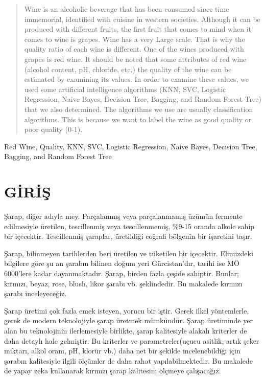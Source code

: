 \documentclass[conference]{IEEEtran}
\begin{document}
\begin{abstract}
Wine is an alcoholic beverage that has been consumed since time immemorial, identified with cuisine in western societies. Although it can be produced with different fruits, the first fruit that comes to mind when it comes to wine is grapes. Wine has a very Large scale. That is why the quality ratio of each wine is different. One of the wines produced with grapes is red wine. It should be noted that some attributes of red wine (alcohol content, pH, chloride, etc.) the quality of the wine can be estimated by examining its values. In order to examine these values, we used some artificial intelligence algorithms (KNN, SVC, Logistic Regression, Naive Bayes, Decision Tree, Bagging, and Random Forest Tree) that we also determined. The algorithms we use are usually classification algorithms. This is because we want to label the wine as good quality or poor quality (0-1).
\end{abstract}

\begin{IEEEkeywords}
Red Wine, Quality, KNN, SVC, Logistic Regression, Naive Bayes, Decision Tree, Bagging, and Random Forest Tree
\end{IEEEkeywords}

\section{\textbf{GİRİŞ}}
\quad Şarap, diğer adıyla mey. Parçalanmış veya parçalanmamış üzümün fermente edilmesiyle\cite{1} üretilen, tescillenmiş veya tescillenmemiş, \%9-15 oranda alkole sahip\cite{2} bir içecektir. Tescillenmiş şaraplar, üretildiği coğrafi bölgenin bir işaretini taşır\cite{3}.

\quad Şarap, bilinmeyen tarihlerden beri üretilen ve tüketilen bir içecektir. Elimizdeki bilgilere göre şu an şarabın bilinen doğum yeri Gürcistan’dır, tarihi ise MÖ 6000’lere kadar dayanmaktadır\cite{2}. Şarap, birden fazla çeşide sahiptir. Bunlar; kırmızı, beyaz, rose, blush, likor şarabı vb. şeklindedir\cite{1}. Bu makalede kırmızı şarabı inceleyeceğiz.

\quad Şarap üretimi çok fazla emek isteyen, yorucu bir iştir. Gerek ilkel yöntemlerle, gerek de modern teknolojiyle şarap üretmek mümkündür. Şarap üretiminde yer alan bu teknolojinin ilerlemesiyle birlikte, şarap kalitesiyle alakalı kriterler de daha detaylı hale gelmiştir\cite{1}. Bu kriterler ve parametreler(uçucu asitlik, artık şeker miktarı, alkol oranı, pH, klorür vb.) daha net bir şekilde incelenebildiği için şarabın kalitesiyle ilgili ölçümler de daha rahat yapılabilmektedir. Bu makalede de yapay zeka kullanarak kırmızı şarap kalitesini ölçmeye çalışacağız.
\end{document}
